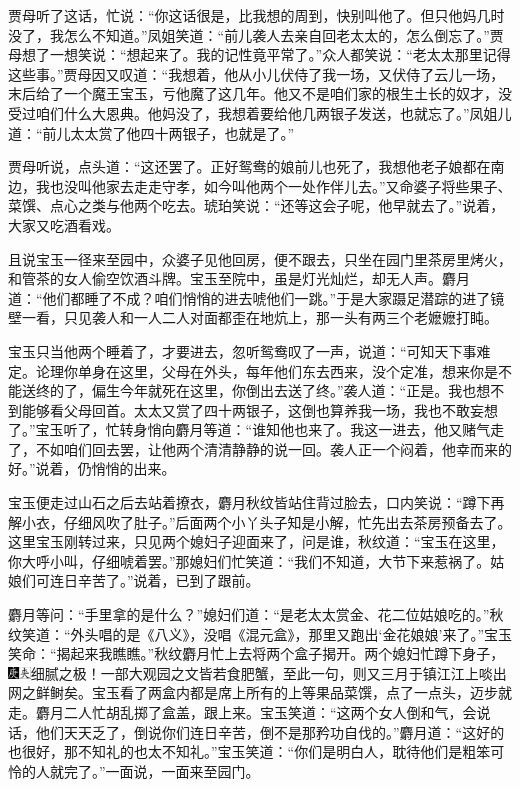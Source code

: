 贾母听了这话，忙说：“你这话很是，比我想的周到，快别叫他了。但只他妈几时没了，我怎么不知道。”凤姐笑道：“前儿袭人去亲自回老太太的，怎么倒忘了。”贾母想了一想笑说：“想起来了。我的记性竟平常了。”众人都笑说：“老太太那里记得这些事。”贾母因又叹道：“我想着，他从小儿伏侍了我一场，又伏侍了云儿一场，末后给了一个魔王宝玉，亏他魔了这几年。他又不是咱们家的根生土长的奴才，没受过咱们什么大恩典。他妈没了，我想着要给他几两银子发送，也就忘了。”凤姐儿道：“前儿太太赏了他四十两银子，也就是了。”

贾母听说，点头道：“这还罢了。正好鸳鸯的娘前儿也死了，我想他老子娘都在南边，我也没叫他家去走走守孝，如今叫他两个一处作伴儿去。”又命婆子将些果子、菜馔、点心之类与他两个吃去。琥珀笑说：“还等这会子呢，他早就去了。”说着，大家又吃酒看戏。

且说宝玉一径来至园中，众婆子见他回房，便不跟去，只坐在园门里茶房里烤火，和管茶的女人偷空饮酒斗牌。宝玉至院中，虽是灯光灿烂，却无人声。麝月道：“他们都睡了不成？咱们悄悄的进去唬他们一跳。”于是大家蹑足潜踪的进了镜壁一看，只见袭人和一人二人对面都歪在地炕上，那一头有两三个老嬷嬷打盹。

宝玉只当他两个睡着了，才要进去，忽听鸳鸯叹了一声，说道：“可知天下事难定。论理你单身在这里，父母在外头，每年他们东去西来，没个定准，想来你是不能送终的了，偏生今年就死在这里，你倒出去送了终。”袭人道：“正是。我也想不到能够看父母回首。太太又赏了四十两银子，这倒也算养我一场，我也不敢妄想了。”宝玉听了，忙转身悄向麝月等道：“谁知他也来了。我这一进去，他又赌气走了，不如咱们回去罢，让他两个清清静静的说一回。袭人正一个闷着，他幸而来的好。”说着，仍悄悄的出来。

宝玉便走过山石之后去站着撩衣，麝月秋纹皆站住背过脸去，口内笑说：“蹲下再解小衣，仔细风吹了肚子。”后面两个小丫头子知是小解，忙先出去茶房预备去了。这里宝玉刚转过来，只见两个媳妇子迎面来了，问是谁，秋纹道：“宝玉在这里，你大呼小叫，仔细唬着罢。”那媳妇们忙笑道：“我们不知道，大节下来惹祸了。姑娘们可连日辛苦了。”说着，已到了跟前。

麝月等问：“手里拿的是什么？”媳妇们道：“是老太太赏金、花二位姑娘吃的。”秋纹笑道：“外头唱的是《八义》，没唱《混元盒》，那里又跑出‘金花娘娘’来了。”宝玉笑命：“揭起来我瞧瞧。”秋纹麝月忙上去将两个盒子揭开。两个媳妇忙蹲下身子，{\includegraphics[width=3mm]{../Images/00004}\includegraphics[width=3mm]{../Images/00012}\footnotesize \kaishu 细腻之极！一部大观园之文皆若食肥蟹，至此一句，则又三月于镇江江上啖出网之鲜鲥矣。}宝玉看了两盒内都是席上所有的上等果品菜馔，点了一点头，迈步就走。麝月二人忙胡乱掷了盒盖，跟上来。宝玉笑道：“这两个女人倒和气，会说话，他们天天乏了，倒说你们连日辛苦，倒不是那矜功自伐的。”麝月道：“这好的也很好，那不知礼的也太不知礼。”宝玉笑道：“你们是明白人，耽待他们是粗笨可怜的人就完了。”一面说，一面来至园门。

